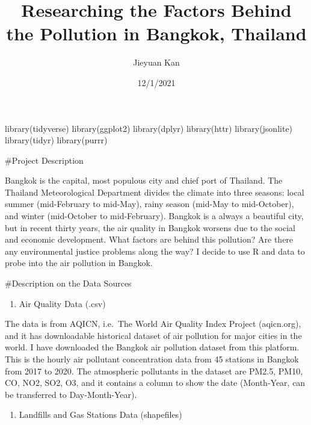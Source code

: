 \documentclass[
]{article}
\title{Researching the Factors Behind the Pollution in Bangkok,
Thailand}
\author{Jieyuan Kan}
\date{12/1/2021}
\newenvironment{Shaded}{\begin{snugshade}}{\end{snugshade}}
\newcommand{\FunctionTok}[1]{\textcolor[rgb]{0.00,0.00,0.00}{#1}}
\newcommand{\NormalTok}[1]{#1}
\providecommand{\tightlist}{%
  \setlength{\itemsep}{0pt}\setlength{\parskip}{0pt}}
\begin{document}
\maketitle

\begin{Shaded}
\begin{Highlighting}[]
\FunctionTok{library}\NormalTok{(tidyverse)}
\FunctionTok{library}\NormalTok{(ggplot2)}
\FunctionTok{library}\NormalTok{(dplyr)}
\FunctionTok{library}\NormalTok{(httr)}
\FunctionTok{library}\NormalTok{(jsonlite)}
\FunctionTok{library}\NormalTok{(tidyr)}
\FunctionTok{library}\NormalTok{(purrr)}
\end{Highlighting}
\end{Shaded}

\#Project Description

Bangkok is the capital, most populous city and chief port of Thailand.
The Thailand Meteorological Department divides the climate into three
seasons: local summer (mid-February to mid-May), rainy season (mid-May
to mid-October), and winter (mid-October to mid-February). Bangkok is a
always a beautiful city, but in recent thirty years, the air quality in
Bangkok worsens due to the social and economic development. What factors
are behind this pollution? Are there any environmental justice problems
along the way? I decide to use R and data to probe into the air
pollution in Bangkok.

\#Description on the Data Sources

\begin{enumerate}
\def\labelenumi{\arabic{enumi}.}
\tightlist
\item
  Air Quality Data (.csv)
\end{enumerate}

The data is from AQICN, i.e.~The World Air Quality Index Project
(aqicn.org), and it has downloadable historical dataset of air pollution
for major cities in the world. I have downloaded the Bangkok air
pollution dataset from this platform. This is the hourly air pollutant
concentration data from 45 stations in Bangkok from 2017 to 2020. The
atmospheric pollutants in the dataset are PM2.5, PM10, CO, NO2, SO2, O3,
and it contains a column to show the date (Month-Year, can be
transferred to Day-Month-Year).

\begin{enumerate}
\def\labelenumi{\arabic{enumi}.}
\setcounter{enumi}{1}
\tightlist
\item
  Landfills and Gas Stations Data (shapefiles)
\end{enumerate}
\end{document}
